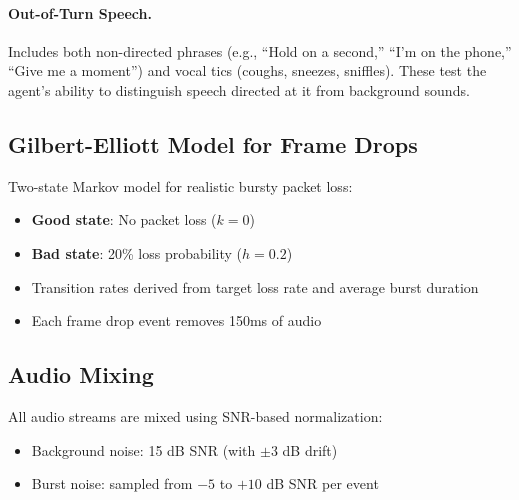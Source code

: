 \paragraph{Out-of-Turn Speech.} Includes both non-directed phrases (e.g., ``Hold on a second,'' ``I'm on the phone,'' ``Give me a moment'') and vocal tics (coughs, sneezes, sniffles). These test the agent's ability to distinguish speech directed at it from background sounds.

\subsection{Gilbert-Elliott Model for Frame Drops}

Two-state Markov model for realistic bursty packet loss:
\begin{itemize}
    \item \textbf{Good state}: No packet loss ($k=0$)
    \item \textbf{Bad state}: 20\% loss probability ($h=0.2$)
    \item Transition rates derived from target loss rate and average burst duration
    \item Each frame drop event removes 150ms of audio
\end{itemize}

\subsection{Audio Mixing}

All audio streams are mixed using SNR-based normalization:
\begin{itemize}
    \item Background noise: 15 dB SNR (with $\pm$3 dB drift)
    \item Burst noise: sampled from $-5$ to $+10$ dB SNR per event
\end{itemize}
